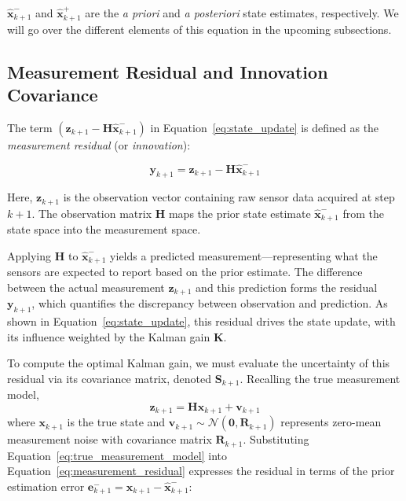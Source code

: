 \documentclass{article}
\begin{document}
	\noindent $\hat{\mathbf{x}}_{k+1}^-$ and $\hat{\mathbf{x}}_{k+1}^+$ are the \emph{a priori} and \emph{a posteriori} state estimates, respectively. We will go over the different elements of this equation in the upcoming subsections.
	
	
	\subsection{Measurement Residual and Innovation Covariance}
	
	The term $\left( \mathbf{z}_{k+1} - \mathbf{H} \hat{\mathbf{x}}_{k+1}^- \right)$ in Equation~\ref{eq:state_update} is defined as the \emph{measurement residual} (or \emph{innovation}):
	
	\begin{equation}
		\mathbf{y}_{k+1} = \mathbf{z}_{k+1} - \mathbf{H} \hat{\mathbf{x}}_{k+1}^-
		\label{eq:measurement_residual}
	\end{equation}
	
	Here, $\mathbf{z}_{k+1}$ is the observation vector containing raw sensor data acquired at step $k+1$. The observation matrix $\mathbf{H}$ maps the prior state estimate $\hat{\mathbf{x}}_{k+1}^-$ from the state space into the measurement space. 
	
	Applying $\mathbf{H}$ to $\hat{\mathbf{x}}_{k+1}^-$ yields a predicted measurement—representing what the sensors are expected to report based on the prior estimate. The difference between the actual measurement $\mathbf{z}_{k+1}$ and this prediction forms the residual $\mathbf{y}_{k+1}$, which quantifies the discrepancy between observation and prediction. As shown in Equation~\ref{eq:state_update}, this residual drives the state update, with its influence weighted by the Kalman gain $\mathbf{K}$.
	
	To compute the optimal Kalman gain, we must evaluate the uncertainty of this residual via its covariance matrix, denoted $\mathbf{S}_{k+1}$. Recalling the true measurement model,
	\begin{equation}
		\mathbf{z}_{k+1} = \mathbf{H} \mathbf{x}_{k+1} + \mathbf{v}_{k+1}
		\label{eq:true_measurement_model}
	\end{equation}
	where $\mathbf{x}_{k+1}$ is the true state and $\mathbf{v}_{k+1} \sim \mathcal{N}(\mathbf{0}, \mathbf{R}_{k+1})$ represents zero-mean measurement noise with covariance matrix $\mathbf{R}_{k+1}$. Substituting Equation~\ref{eq:true_measurement_model} into Equation~\ref{eq:measurement_residual} expresses the residual in terms of the prior estimation error $\mathbf{e}_{k+1}^- = \mathbf{x}_{k+1} - \hat{\mathbf{x}}_{k+1}^-$:
	
\end{document}
